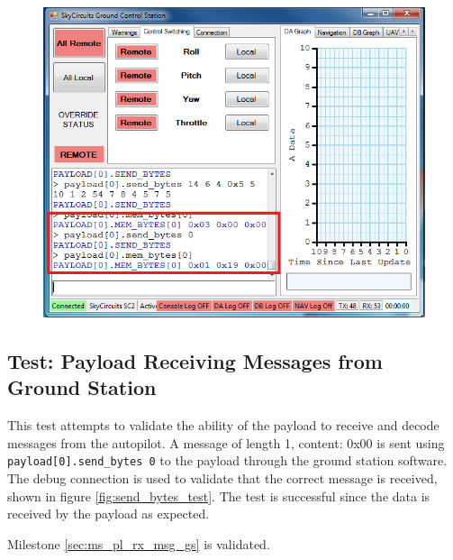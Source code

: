 \begin{figure}[H]
        \centering
        \includegraphics[width=1.0\textwidth]{testing_screenshots/mem_bytes_test.png}
        \label{fig:mem_bytes_test}
\end{figure}

\subsection{Test:  Payload Receiving Messages from Ground Station}
\label{sec:test_pl_receive_message}
This test attempts to validate the ability of the payload to receive and decode messages from the
autopilot. A message of length 1, content: 0x00 is sent using \verb+payload[0].send_bytes 0+ to
the payload through the ground station software. The debug connection is used to validate that the
correct message is received, shown in figure \ref{fig:send_bytes_test}. The test is successful
since the data is received by the payload as expected.

Milestone \ref{sec:ms_pl_rx_msg_gs} is validated.

